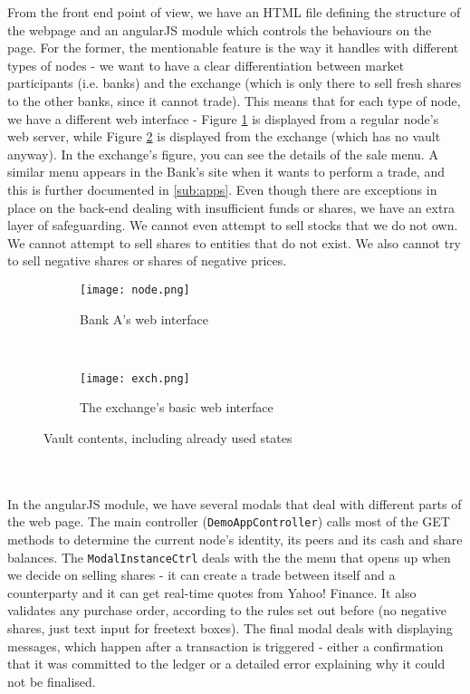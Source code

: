 \documentclass[12pt,twoside]{article}
\begin{document}

From the front end point of view, we have an HTML file defining the structure of the webpage and an angularJS module which controls the behaviours on the page. For the former, the mentionable feature is the way it handles with different types of nodes - we want to have a clear differentiation between market participants (i.e. banks) and the exchange (which is only there to sell fresh shares to the other banks, since it cannot trade). This means that for each type of node, we have a different web interface - Figure \ref{fig:node} is displayed from a regular node's web server, while Figure \ref{fig:exch} is displayed from the exchange (which has no vault anyway). In the exchange's figure, you can see the details of the sale menu. A similar menu appears in the Bank's site when it wants to perform a trade, and this is further documented in \ref{sub:apps}. Even though there are exceptions in place on the back-end dealing with insufficient funds or shares, we have an extra layer of safeguarding. We cannot even attempt to sell stocks that we do not own. We cannot attempt to sell shares to entities that do not exist. We also cannot try to sell negative shares or shares of negative prices. 
\begin{figure}[!htb]
    \centering
    \begin{subfigure}[b]{1\textwidth}
    	\centering
        \texttt{[image: node.png]}
        \caption{Bank A's web interface}
        \label{fig:node}
    \end{subfigure}
    ~
    \begin{subfigure}[b]{0.85\textwidth}
    	\centering
        \texttt{[image: exch.png]}
        \caption{The exchange's basic web interface}
        \label{fig:exch}
    \end{subfigure}
    \caption{Vault contents, including already used states}
    \label{fig:WEBinterfaces}
\end{figure}
\\ \\
In the angularJS module, we have several modals that deal with different parts of the web page. The main controller (\verb|DemoAppController|) calls most of the GET methods to determine the current node's identity, its peers and its cash and share balances. The \verb|ModalInstanceCtrl| deals with the the menu that opens up when we decide on selling shares - it can create a trade between itself and a counterparty and it can get real-time quotes from Yahoo! Finance. It also validates any purchase order, according to the rules set out before (no negative shares, just text input for freetext boxes). The final modal deals with displaying messages, which happen after a transaction is triggered - either a confirmation that it was committed to the ledger or a detailed error explaining why it could not be finalised.
\end{document}
